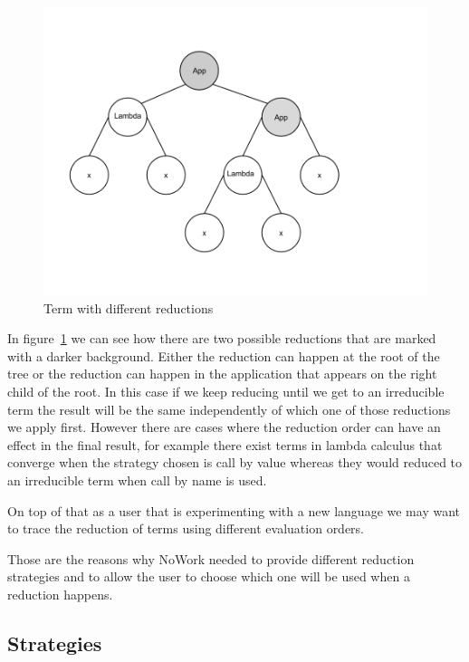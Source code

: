 \documentclass[12pt,a4paper]{article}
\begin{document}
\begin{figure}[!h]
\includegraphics[scale=0.4]{multiple-reductions.png}

\caption{Term with different reductions}
\label{multiple-reductions}
\end{figure}

In figure~\ref{multiple-reductions} we can see how there are two possible reductions that are marked with
a darker background. Either the reduction can happen at the root of
the tree or the reduction can happen in the application that appears
on the right child of the root. In this case if we keep
reducing until we get to an irreducible term the result will be the
same independently of which one of those reductions we apply
first. However there are cases where the reduction order can have an
effect in the final result, for example there exist terms in lambda
calculus that converge when the strategy chosen is call by value
whereas they would reduced to an irreducible term when call by name is
used. 

On top of that as a user that is experimenting with a new language we
may want to trace the reduction of terms using different evaluation
orders.

Those are the reasons why NoWork needed to provide different reduction strategies and to
allow the user to choose which one will be used when a reduction happens.

\subsection{Strategies}
\end{document}
